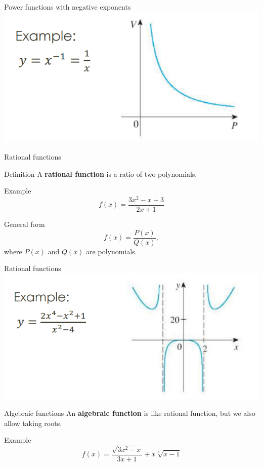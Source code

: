 \documentclass[t]{beamer}
\begin{document}
\begin{frame}{Power functions with negative exponents}
\vfill
\includegraphics[width=\textwidth]{negative}
\vfill
\end{frame}

\begin{frame}{Rational functions}
\begin{block}{Definition}
A \textbf{rational function} is a ratio of two polynomials.
\end{block}
\begin{block}{Example}
$$f(x) = \frac{3x^2 - x+ 3}{2x+1}$$
\end{block}
\begin{block}{General form}
$$f(x) = \frac{P(x)}{Q(x)},$$
where $P(x)$ and $Q(x)$ are polynomials.
\end{block}
\end{frame}

\begin{frame}{Rational functions}
\vfill
\includegraphics[width=\textwidth]{rational}
\vfill
\end{frame}

\begin{frame}{Algebraic functions}
An \textbf{algebraic function} is like rational function, but we also
allow taking roots.
\begin{block}{Example}
$$f(x) = \frac{\sqrt{3x^2 - x}}{3x+1} + x\sqrt[3]{x-1}$$
\end{block}
\end{frame}
\end{document}

